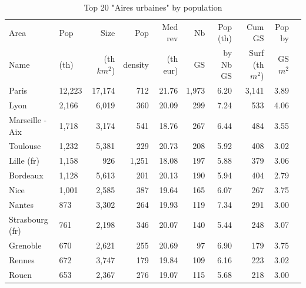 \documentclass[11pt]{article}
\begin{document}
\begin{table}[H]
\caption{Top 20 "Aires urbaines" by population}
\small
\renewcommand{\arraystretch}{0.7}%

\begin{tabular}{llrrrrrrrr}
\toprule
\toprule
Area             &      Pop   &   Size     &  Pop         & Med rev    & Nb         &  Pop (th)  & Cum GS          & Pop by       \\
Name             &      (th)  & (th $km^2$)&  density     & (th eur)   & GS         &  by Nb GS  & Surf (th $m^2$) & GS $m^2$  \\
\midrule
           Paris &     12,223 &     17,174 &          712 &      21.76 &      1,973 &       6.20 &      3,141 &        3.89 \\
            Lyon &      2,166 &      6,019 &          360 &      20.09 &        299 &       7.24 &        533 &        4.06 \\
 Marseille - Aix &      1,718 &      3,174 &          541 &      18.76 &        267 &       6.44 &        484 &        3.55 \\
        Toulouse &      1,232 &      5,381 &          229 &      20.73 &        208 &       5.92 &        408 &        3.02 \\
      Lille (fr) &      1,158 &        926 &        1,251 &      18.08 &        197 &       5.88 &        379 &        3.06 \\
        Bordeaux &      1,128 &      5,613 &          201 &      20.13 &        190 &       5.94 &        404 &        2.79 \\
            Nice &      1,001 &      2,585 &          387 &      19.64 &        165 &       6.07 &        267 &        3.75 \\
          Nantes &        873 &      3,302 &          264 &      19.93 &        119 &       7.34 &        291 &        3.00 \\
 Strasbourg (fr) &        761 &      2,198 &          346 &      20.07 &        140 &       5.44 &        248 &        3.07 \\
        Grenoble &        670 &      2,621 &          255 &      20.69 &         97 &       6.90 &        179 &        3.75 \\
          Rennes &        672 &      3,747 &          179 &      19.84 &        109 &       6.16 &        223 &        3.02 \\
           Rouen &        653 &      2,367 &          276 &      19.07 &        115 &       5.68 &        218 &        3.00 \\

\end{tabular}
\end{table}
\end{document}
